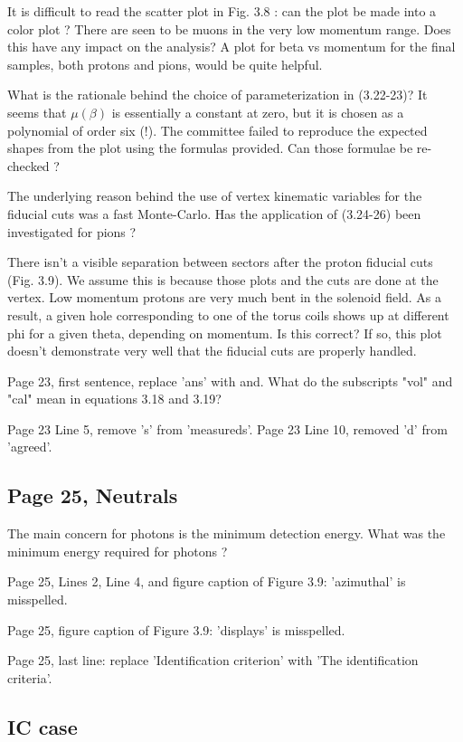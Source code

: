 \documentclass[11pt]{paper}
\begin{document}
It is difficult to read the scatter plot in Fig. 3.8 : can the plot be made into a color plot ?
There are seen to be muons in the very low momentum range. Does this have any impact on the analysis? A plot for beta vs momentum for the final samples, both protons and pions, would be quite helpful.

What is the rationale behind the choice of parameterization in (3.22-23)?
It seems that $\mu(\beta)$ is essentially a constant at zero, but it is chosen as a polynomial of order six (!).
The committee failed to reproduce the expected shapes from the plot using the formulas provided.
Can those formulae be re-checked ?

The underlying reason behind the use of vertex kinematic variables for the fiducial cuts was a fast Monte-Carlo.
Has the application of (3.24-26) been investigated for pions ?

There isn't a visible separation between sectors after the proton fiducial cuts (Fig. 3.9). We assume this is because those plots and the cuts are done at the vertex. Low momentum protons are very much bent in the solenoid field. As a result, a given hole corresponding to one of the torus coils shows up at different phi for a given theta, depending on momentum. Is this correct? If so, this plot doesn't demonstrate very well that the fiducial cuts are properly handled.

Page 23, first sentence, replace 'ans' with and. What do the subscripts "vol" and "cal" mean in equations 3.18 and 3.19?

Page 23 Line 5, remove 's' from 'measureds'.
Page 23 Line 10, removed 'd' from 'agreed'.

\subsection*{Page 25, Neutrals}

The main concern for photons is the minimum detection energy.
What was the minimum energy required for photons ?

Page 25, Lines 2, Line 4, and figure caption of Figure 3.9: 'azimuthal' is misspelled.

Page 25, figure caption of Figure 3.9: 'displays' is misspelled.

Page 25, last line: replace 'Identification criterion' with 'The identification criteria'.

\subsection*{IC case}
\end{document}
